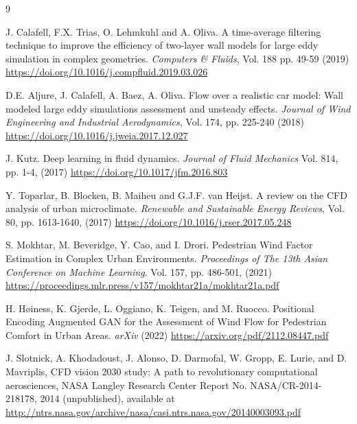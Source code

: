 \documentclass{article}
\begin{document}
\begin{thebibliography}{9}

J. Calafell, F.X. Trias, O. Lehmkuhl and A. Oliva. A time-average filtering technique to improve the efficiency of two-layer wall models for large eddy simulation in complex geometries. {\it Computers \& Fluids}, Vol. 188 pp. 49-59 (2019) \href{https://doi.org/10.1016/j.compfluid.2019.03.026}{https://doi.org/10.1016/j.compfluid.2019.03.026} 

D.E. Aljure, J. Calafell, A. Baez, A. Oliva. Flow over a realistic car model: Wall modeled large eddy simulations assessment and unsteady effects. {\it Journal of Wind Engineering and Industrial Aerodynamics}, Vol. 174, pp. 225-240 (2018) \href{https://doi.org/10.1016/j.jweia.2017.12.027}{https://doi.org/10.1016/j.jweia.2017.12.027}

J. Kutz. Deep learning in fluid dynamics. {\it Journal of Fluid Mechanics} Vol. 814, pp. 1-4, (2017) \href{https://doi.org/10.1017/jfm.2016.803}{https://doi.org/10.1017/jfm.2016.803}

Y. Toparlar, B. Blocken, B. Maiheu and G.J.F. van Heijst. A review on the CFD analysis of urban microclimate. {\it Renewable and Sustainable Energy Reviews}, Vol. 80, pp. 1613-1640, (2017) \href{https://doi.org/10.1016/j.rser.2017.05.248}{https://doi.org/10.1016/j.rser.2017.05.248}


S. Mokhtar, M. Beveridge, Y. Cao, and I. Drori. Pedestrian Wind Factor Estimation in Complex Urban Environments. {\it  Proceedings of The 13th Asian Conference on Machine Learning}. Vol. 157, pp. 486-501, (2021) \href{https://proceedings.mlr.press/v157/mokhtar21a/mokhtar21a.pdf}{https://proceedings.mlr.press/v157/mokhtar21a/mokhtar21a.pdf}

H. Høiness, K. Gjerde, L. Oggiano, K. Teigen, and M. Ruocco. Positional Encoding Augmented GAN for the Assessment of Wind Flow for Pedestrian Comfort in Urban Areas. {\it arXiv} (2022) \href{https://arxiv.org/pdf/2112.08447.pdf}{https://arxiv.org/pdf/2112.08447.pdf} 


 J. Slotnick, A. Khodadoust, J. Alonso, D. Darmofal, W. Gropp, E. Lurie, and D. Mavriplis, CFD vision 2030 study: A path to revolutionary computational aerosciences, NASA Langley Research Center Report No. NASA/CR-2014-218178, 2014 (unpublished), available at \href{http://ntrs.nasa.gov/archive/nasa/casi.ntrs.nasa.gov/20140003093.pdf}{http://ntrs.nasa.gov/archive/nasa/casi.ntrs.nasa.gov/20140003093.pdf}


\end{thebibliography}
\end{document}
